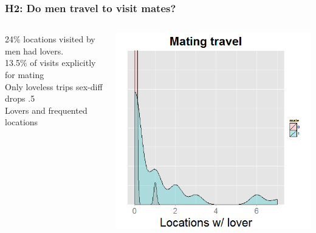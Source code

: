 \documentclass{beamer}
\begin{document}
\begin{frame}
\frametitle{H2: Do men travel to visit mates?}

\begin{columns}
\begin{column}{.6\textwidth}
24\% locations visited by men had lovers. \\
\vspace{0.75cm} 
13.5\% of visits explicitly for mating \\
\vspace{0.75cm} 
Only loveless trips sex-diff drops .5 \\
\vspace{0.75cm} 
Lovers and frequented locations \\

\end{column}


\begin{column}{.4\textwidth}
\includegraphics[width=1\linewidth]{mobmat_sex}
\end{column}

\end{columns}

\end{frame}


\end{document}
